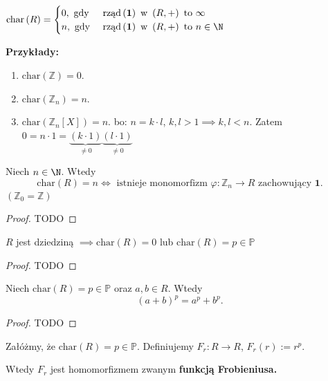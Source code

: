 \begin{definition}[Charakterystyka.]
	$\text{char}\left( R \right) = \begin{cases}
		0, \text{ gdy }& \text{rząd}\left( \mathbf{1} \right) \text{ w } \left( R, + \right) \text{ to } \infty \\
                n, \text{ gdy }& \text{rząd}\left( \mathbf{1} \right) \text{ w } \left( R, + \right) \text{ to } n\in \N
	\end{cases}$
\end{definition} 
\noindent \textbf{Przykłady:}
\begin{enumerate}[label=\arabic*)]
	\item $\text{char}\left(\mathbb{Z} \right) = 0$.
	\item $\text{char}\left(\mathbb{Z} _{n} \right) = n$.
	\item $\text{char}\left(\mathbb{Z} _{n} \left[ X \right] \right) = n.$
	bo: $n = k\cdot l$, $k,l > 1 \implies k,l <n$. Zatem $0 = n\cdot 1 = \underbrace{ \left( k\cdot 1 \right) }_{\neq 0} \underbrace{\left( l\cdot 1 \right) }_{\neq 0}$
\end{enumerate}
\begin{fact}

	Niech $n\in \N$. Wtedy
	\[
	\text{char}\left(R\right) = n \iff \text{ istnieje monomorfizm }\varphi :\mathbb{Z} _{n} \to R \text{ zachowujący $\mathbf{1}$}  
	.\] 
	$(\mathbb{Z}_{0} = \mathbb{Z} )$
\end{fact}
\begin{proof}
	TODO
\end{proof} 
\begin{corollary}

	$R$ jest dziedziną $\implies \text{char}\left(R\right) = 0$ lub $\text{char}\left(R\right) = p \in \mathbb{P} $
\end{corollary}
\begin{proof}
	TODO
\end{proof} 
\begin{fact}

	Niech $\text{char}\left(R\right) = p\in \mathbb{P} $ oraz $a,b \in R$. Wtedy
	\[
		\left( a+b \right) ^{p} = a^{p} + b^{p}
	.\] 
\end{fact}
\begin{proof}
	TODO
\end{proof} 
\begin{corollary}

	Załóżmy, że $\text{char}\left(R\right) = p \in \mathbb{P} $. Definiujemy $F_{r}: R \to R$, $F_{r}\left( r \right) := r^{p}$.

	Wtedy $F_{r}$ jest homomorfizmem zwanym \textbf{funkcją Frobieniusa.} 
\end{corollary}
